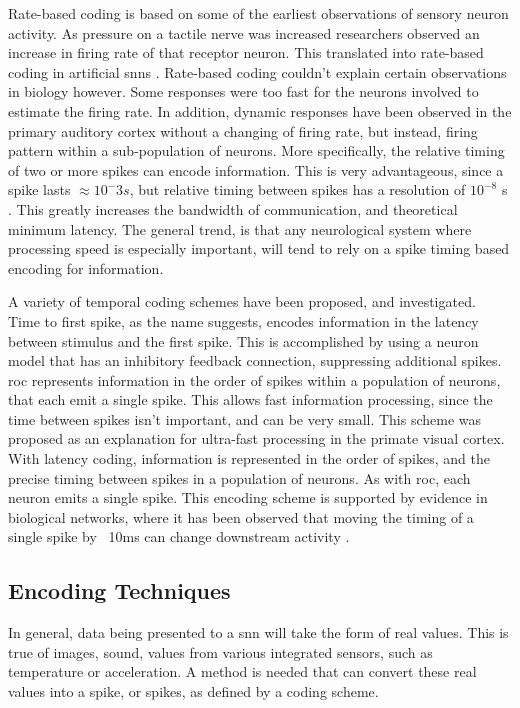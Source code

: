     Rate-based coding is based on some of the earliest observations of sensory
    neuron activity. As pressure on a tactile nerve was increased researchers
    observed an increase in firing rate of that receptor neuron. This translated
    into rate-based coding in artificial \glspl{snn}
    \parencite{ponulak_2011}. Rate-based coding couldn't explain certain
    observations in biology however. Some responses were too fast for the
    neurons involved to estimate the firing rate. In addition, dynamic responses
    have been observed in the primary auditory cortex without a changing of
    firing rate, but instead, firing pattern within a sub-population of
    neurons. More specifically, the relative timing of two or more spikes can
    encode information. This is very advantageous, since a spike lasts $\approx
    10^-3s$, but relative timing between spikes has a resolution of $10^{-8}$ s
    \parencite{ponulak_2011}. This greatly increases the bandwidth of
    communication, and theoretical minimum latency. The general trend, is that
    any neurological system where processing speed is especially important, will
    tend to rely on a spike timing based encoding for information.

    A variety of temporal coding schemes have been proposed, and
    investigated. Time to first spike, as the name suggests, encodes information
    in the latency between stimulus and the first spike. This is accomplished by
    using a neuron model that has an inhibitory feedback connection, suppressing
    additional spikes. \gls{roc} represents information in the order of spikes
    within a population of neurons, that each emit a single spike. This allows
    fast information processing, since the time between spikes isn't important,
    and can be very small. This scheme was proposed as an explanation for
    ultra-fast processing in the primate visual cortex. With latency coding,
    information is represented in the order of spikes, and the precise timing
    between spikes in a population of neurons. As with \gls{roc}, each neuron
    emits a single spike. This encoding scheme is supported by evidence in
    biological networks, where it has been observed that moving the timing of a
    single spike by ~10ms can change downstream activity
    \parencite{ponulak_2011}.
        
    \subsection{Encoding Techniques}
    In general, data being presented to a \gls{snn} will take the form of real
    values. This is true of images, sound, values from various integrated
    sensors, such as temperature or acceleration. A method is needed that can
    convert these real values into a spike, or spikes, as defined by a coding
    scheme.
    
